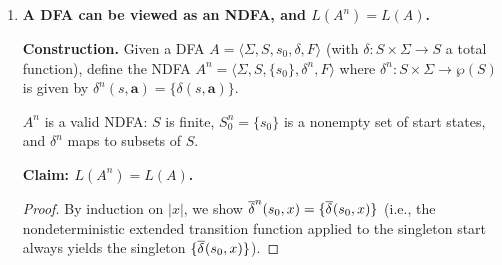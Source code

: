 \begin{enumerate}[{4.}1.]
\begin{proof}
\textbf{Inductive step.}  Assume the result holds for all words of length $k$.
Let $y=x\pmb{a}$ with $|x|=k$ and $\pmb{a}\in\Sigma$.  Then:
\begin{align*}
  \overline{\delta^{\sigma}_\lambda}(s,x\pmb{a})
  &= \bigcup_{t\in\overline{\delta^{\sigma}_\lambda}(s,x)}
      \delta^{\sigma}_\lambda(t,\pmb{a}) \\
  &= \bigcup_{t\in\DBAR_\lambda(s,x)}
      \delta^{\sigma}_\lambda(t,\pmb{a}) \quad\text{(induction hypothesis)} \\
  &= \bigcup_{t\in\DBAR_\lambda(s,x)}
      \DBAR_\lambda(t,\pmb{a}) \quad\text{(base case)}.
\end{align*}
Let $D=\DBAR_\lambda(s,x)$.  Since every value of $\DBAR_\lambda$ is obtained
by applying $\Lambda$, the set $D$ is $\lambda$-closed.  Therefore
\begin{align*}
\bigcup_{t\in D}\DBAR_\lambda(t,\pmb{a})
&=
\bigcup_{t\in D}
\Lambda\Bigl(\bigcup_{q\in\Lambda(t)}\delta_\lambda(q,\pmb{a})\Bigr) \\
&=
\Lambda\Bigl(\bigcup_{t\in D}\bigcup_{q\in\Lambda(t)}\delta_\lambda(q,\pmb{a})\Bigr) \\
&=
\Lambda\Bigl(\bigcup_{q\in D}\delta_\lambda(q,\pmb{a})\Bigr)
\qquad\text{(because $\Lambda(t)\subseteq D$ for every $t\in D$)} \\
&= \DBAR_\lambda(s,x\pmb{a}).
\end{align*}
By induction, the result holds for all $x\in\Sigma^+$. \qed
\end{proof}

\item \textbf{A DFA can be viewed as an NDFA, and $L(A^n)=L(A)$.}

\textbf{Construction.}  Given a DFA $A=\langle\Sigma,S,s_0,\delta,F\rangle$
(with $\delta:S\times\Sigma\to S$ a total function), define the NDFA
$A^n=\langle\Sigma,S,\{s_0\},\delta^n,F\rangle$ where
$\delta^n:S\times\Sigma\to\wp(S)$ is given by $\delta^n(s,\pmb{a})=\{\delta(s,\pmb{a})\}$.

$A^n$ is a valid NDFA: $S$ is finite, $S_0^n=\{s_0\}$ is a nonempty set of
start states, and $\delta^n$ maps to subsets of $S$.

\textbf{Claim: $L(A^n)=L(A)$.}

\begin{proof}
By induction on $|x|$, we show $\overline{\delta}^n(s_0,x)=\{\overline{\delta^{}}(s_0,x)\}$ (i.e., the
nondeterministic extended transition function applied to the singleton start
always yields the singleton $\{\overline{\delta^{}}(s_0,x)\}$).


\end{proof}
\end{enumerate}
